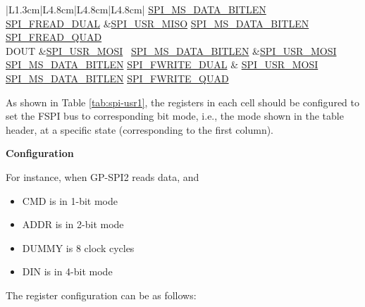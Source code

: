 \documentclass[main\_\_EN.tex]{subfiles}
\begin{document}
\begin{longtable}[c]{ |L{1.3cm}|L{4.8cm}|L{4.8cm}|L{4.8cm}| }
     \hyperref[fielddesc:SPIMSDATABITLEN]{SPI\_MS\_DATA\_BITLEN}  
     \hyperref[fielddesc:SPIFREADDUAL]{SPI\_FREAD\_DUAL} 
     &\hyperref[fielddesc:SPIUSRMISO]{SPI\_USR\_MISO}  
     \hyperref[fielddesc:SPIMSDATABITLEN]{SPI\_MS\_DATA\_BITLEN}  
     \hyperref[fielddesc:SPIFREADQUAD]{SPI\_FREAD\_QUAD}\\
     \hline
DOUT &\hyperref[fielddesc:SPIUSRMOSI]{SPI\_USR\_MOSI}       \
      \hyperref[fielddesc:SPIMSDATABITLEN]{SPI\_MS\_DATA\_BITLEN} 
     &\hyperref[fielddesc:SPIUSRMOSI]{SPI\_USR\_MOSI}       
     \hyperref[fielddesc:SPIMSDATABITLEN]{SPI\_MS\_DATA\_BITLEN}       \hyperref[fielddesc:SPIFWRITEDUAL]{SPI\_FWRITE\_DUAL} & 
     \hyperref[fielddesc:SPIUSRMOSI]{SPI\_USR\_MOSI}       
     \hyperref[fielddesc:SPIMSDATABITLEN]{SPI\_MS\_DATA\_BITLEN}       \hyperref[fielddesc:SPIFWRITEQUAD]{SPI\_FWRITE\_QUAD} \\
     \hline
\end{longtable}

As shown in Table \ref{tab:spi-usr1}, the registers in each cell should be configured to set the FSPI bus to corresponding bit mode, i.e., the mode shown in the table header, at a specific state (corresponding to the first column). 

\textbf{Configuration}

For instance, when GP-SPI2 reads data, and 
\begin{itemize}
    \item CMD is in 1-bit mode
    \item ADDR is in 2-bit mode
    \item DUMMY is 8 clock cycles
    \item DIN is in 4-bit mode
\end{itemize}
The register configuration can be as follows:
\end{document}
